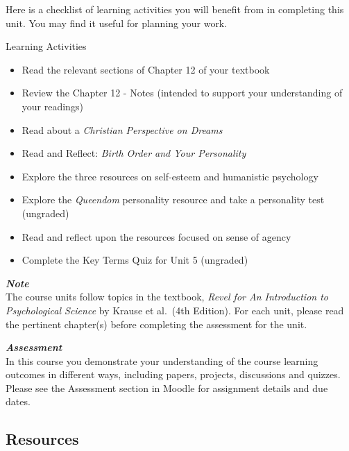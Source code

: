 \documentclass[
]{book}
\providecommand{\tightlist}{%
  \setlength{\itemsep}{0pt}\setlength{\parskip}{0pt}}
\begin{document}
Here is a checklist of learning activities you will benefit from in completing this unit. You may find it useful for planning your work.

\begin{reflect}
{Learning Activities}

\begin{itemize}
\tightlist
\item
  Read the relevant sections of Chapter 12 of your textbook
\item
  Review the Chapter 12 - Notes (intended to support your understanding of your readings)
\item
  Read about a \emph{Christian Perspective on Dreams}
\item
  Read and Reflect: \emph{Birth Order and Your Personality}
\item
  Explore the three resources on self-esteem and humanistic psychology
\item
  Explore the \emph{Queendom} personality resource and take a personality test (ungraded)
\item
  Read and reflect upon the resources focused on sense of agency
\item
  Complete the Key Terms Quiz for Unit 5 (ungraded)
\end{itemize}
\end{reflect}

\begin{caution}
\textbf{\emph{Note}}\\
The course units follow topics in the textbook, \emph{Revel for An Introduction to Psychological Science} by Krause et al.~(4th Edition). For each unit, please read the pertinent chapter(s) before completing the assessment for the unit.
\end{caution}

\begin{assessment}
\textbf{\emph{Assessment}}\\
In this course you demonstrate your understanding of the course learning outcomes in different ways, including papers, projects, discussions and quizzes. Please see the Assessment section in Moodle for assignment details and due dates.
\end{assessment}

\hypertarget{resources-4}{%
\subsection*{Resources}\label{resources-4}}
\end{document}

